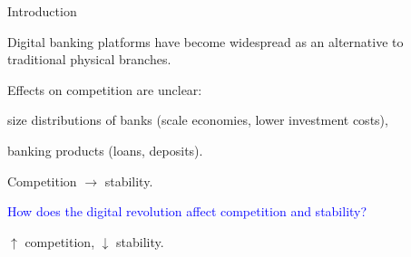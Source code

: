 \documentclass[notes,10pt, aspectratio=169]{beamer}
\newenvironment{wideitemize}{\itemize\addtolength{\itemsep}{10pt}}{\enditemize}
\begin{document}
\begin{frame}{Introduction}

    \vspace{0.2cm}

    \begin{wideitemize}
        \item %
 Digital banking platforms have become widespread as an alternative to traditional physical branches.
        \item Effects on competition are unclear: 
        
        \vspace{0.2cm}
        \begin{wideitemize}
            \item size distributions of banks (scale economies, lower investment costs),
            \item banking products (loans, deposits).

        \end{wideitemize}
        \item Competition $\rightarrow$ stability.
        \pause
        \item \textcolor{blue}{How does the digital revolution affect competition and stability?} 

            \vspace{0.2cm}
            \begin{wideitemize}
                \vspace{0.2cm}
                \item  $\uparrow$ competition, $\downarrow$ stability.

            \end{wideitemize}


    \end{wideitemize}

\end{frame}
\end{document}
